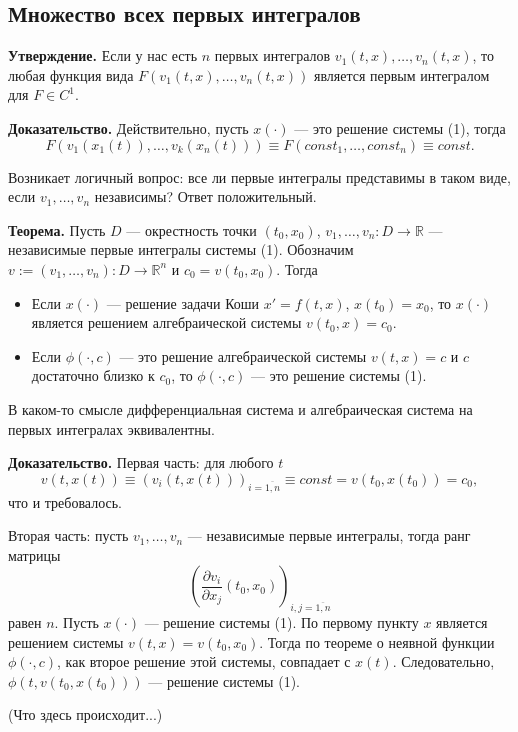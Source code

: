 \QED

\subsection{Множество всех первых интегралов}
\textbf{Утверждение.} Если у нас есть $n$ первых интегралов $v_1(t, x), \dots, v_n(t, x)$, то любая функция вида $F(v_1(t, x), \dots, v_n(t, x))$ является первым интегралом для $F \in C^1$.

\textbf{Доказательство.} Действительно, пусть $x(\cdot)$ --- это решение системы (1), тогда
\[
    F(v_1(x_1(t)), \dots, v_k(x_n(t))) \equiv F(const_1, \dots, const_n) \equiv const.
\]

\QED

Возникает логичный вопрос: все ли первые интегралы представимы в таком виде, если $v_1, \dots, v_n$ независимы? Ответ положительный.

\textbf{Теорема.} Пусть $D$ --- окрестность точки $(t_0, x_0)$, $v_1, \dots, v_n: D \to \mathbb R$ --- независимые первые интегралы системы (1).
Обозначим $v := (v_1, \dots, v_n): D \to \mathbb R^n$ и $c_0 = v(t_0, x_0)$.
Тогда
\begin{itemize}
    \item Если $x(\cdot)$ --- решение задачи Коши $x' = f(t, x)$, $x(t_0) = x_0$, то $x(\cdot)$ является решением алгебраической системы $v(t_0, x) = c_0$.
    \item Если $\phi(\cdot, c)$ --- это решение алгебраической системы $v(t, x) = c$ и $c$ достаточно близко к $c_0$, то $\phi(\cdot, c)$ --- это решение системы (1).
\end{itemize}
В каком-то смысле дифференциальная система и алгебраическая система на первых интегралах эквивалентны.

\textbf{Доказательство.} Первая часть: для любого $t$
\[
    v(t, x(t)) \equiv (v_i(t, x(t)))_{i=\overline{1, n}} \equiv const = v(t_0, x(t_0)) = c_0,
\]
что и требовалось.

Вторая часть: пусть $v_1, \dots, v_n$ --- независимые первые интегралы, тогда ранг матрицы
\[
    \left( \frac{\partial v_i}{\partial x_j}(t_0, x_0) \right)_{i,j = \overline{1, n}}
\]
равен $n$.
Пусть $x(\cdot)$ --- решение системы (1).
По первому пункту $x$ является решением системы $v(t, x) = v(t_0, x_0)$.
Тогда по теореме о неявной функции $\phi(\cdot, c)$, как второе решение этой системы, совпадает с $x(t)$.
Следовательно, $\phi(t, v(t_0, x(t_0)))$ --- решение системы (1).

(Что здесь происходит...)


